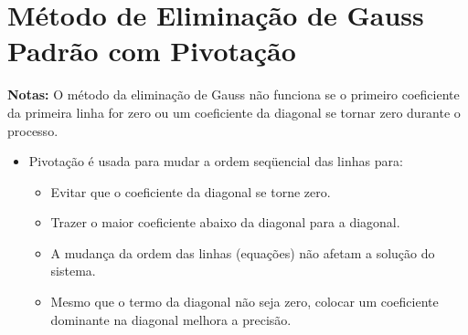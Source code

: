 \section{Método de Eliminação de Gauss Padrão com Pivotação}

\textbf{Notas:} O método da eliminação de Gauss não funciona se o primeiro coeficiente da primeira linha for zero ou um coeficiente da diagonal se tornar zero durante o processo.

\begin{itemize}
 \item Pivotação é usada para mudar a ordem seqüencial das linhas para:

\begin{itemize}
 \item Evitar que o coeficiente da diagonal se torne zero.

\item Trazer o maior coeficiente abaixo da diagonal para a diagonal.

\item A mudança da ordem das linhas (equações) não afetam a solução do sistema.

\item Mesmo que o termo da diagonal não seja zero, colocar um coeficiente dominante na diagonal melhora a precisão.
\end{itemize}

\end{itemize}

